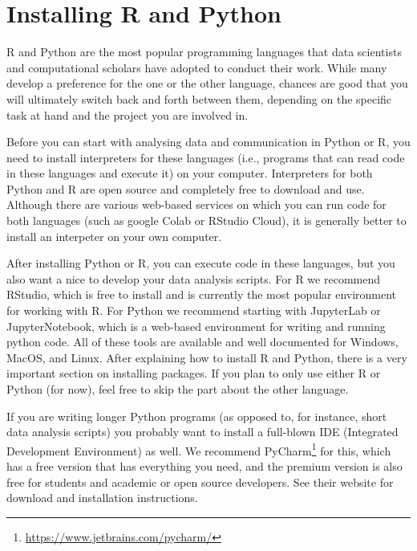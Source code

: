 \section{Installing R and Python}
\label{sec:installing}

R and Python are the most popular programming languages that data
scientists and computational scholars have adopted to conduct their
work. While many develop a preference
for the one or the other language, chances are good that you
will ultimately switch back and forth between them, depending on
the specific task at hand and the project you are involved in.

Before you can start with analysing data and communication in Python or R,
you need to install interpreters for these languages (i.e., programs that can read code in these languages and execute it) on your computer.
Interpreters for both Python and R are open source and completely free to download and use.
Although there are various web-based services on which you can run code for both languages
(such as google Colab or RStudio Cloud),
it is generally better to install an interpeter on your own computer.

After installing Python or R, you can execute code in these languages, but you also want a nice
 to develop your data analysis scripts. 
For R we recommend RStudio, which is free to install and is currently the most popular environment for working with R.
For Python we recommend starting with JupyterLab or JupyterNotebook, which is a web-based environment for writing and running python code.
All of these tools are available and well documented for Windows, MacOS, and Linux. 
After explaining how to install R and Python, there is a very important section on installing packages.
If you plan to only use either R or Python (for now), feel free to skip the part about the other language.

If you are writing longer Python programs (as opposed to, for instance, short data analysis scripts) you probably want to install a full-blown IDE (Integrated Development Environment) as well.
We recommend PyCharm\footnote{\url{https://www.jetbrains.com/pycharm/}} for this, which has a free version that has everything you need, and the premium version is also free for students and academic or open source developers.
See their website for download and installation instructions.


